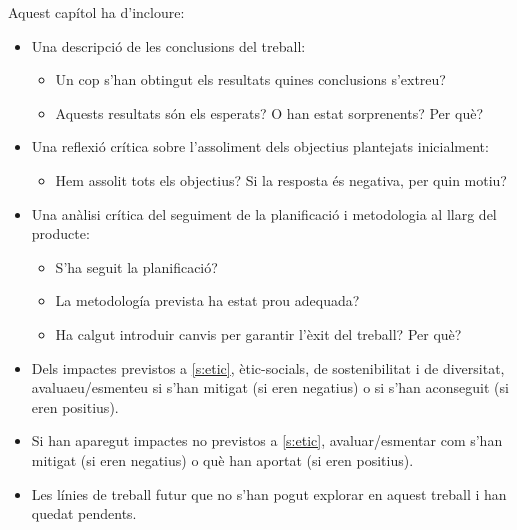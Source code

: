 \documentclass[CAT]{TFUOC}%
\begin{document}
Aquest capítol ha d'incloure:
\begin{itemize}
\item Una descripció de les conclusions del treball:
\begin{itemize}
    \item Un cop s’han obtingut els resultats quines conclusions s’extreu?
    \item Aquests resultats són els esperats? O han estat sorprenents? Per què?
\end{itemize}
\item Una reflexió crítica sobre l’assoliment dels objectius plantejats inicialment:
\begin{itemize}
    \item Hem assolit tots els objectius? Si la resposta és negativa, per quin motiu?
\end{itemize}
\item Una anàlisi crítica del seguiment de la planificació i metodologia al llarg del producte:
\begin{itemize}
    \item S’ha seguit la planificació?
    \item La metodología prevista ha estat prou adequada?
    \item Ha calgut introduir canvis per garantir l’èxit del treball? Per què?
\end{itemize}
\item Dels impactes previstos a \ref{s:etic}, ètic-socials, de sostenibilitat i de diversitat, avaluaeu/esmenteu si s'han mitigat (si eren negatius) o si s'han aconseguit (si eren positius). 
\item Si han aparegut impactes no previstos a \ref{s:etic}, avaluar/esmentar com s'han mitigat (si eren negatius) o què han aportat (si eren positius).
\item Les línies de treball futur que no s’han pogut explorar en aquest treball i han quedat pendents.


\end{itemize}
\end{document}

